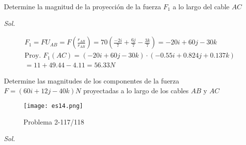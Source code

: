 \begin{problem}
Determine la magnitud de la proyección de la fuerza $F_1$ a lo largo del cable $AC$
\end{problem}
\textit{ Sol. }

\begin{align*}
	 & F_1=FU_{AB}=F\left(\frac{r_{AB}}{r_{AB}}\right)=70\left(\frac{-2i}{7}+\frac{6j}{7}-\frac{3k}{7}\right)=-20i+60j-30k \\
	 & \text{Proy. } F_1(AC)=(-20i+60j-30k)\cdot (-0.55i+0.824j+0.137k)                                                    \\
	 & =11+49.44-4.11=56.33N
\end{align*}

\begin{problem}
Determine las magnitudes de los componentes de la fuerza $F=(60i+12j-40k)N$ proyectadas a lo largo de los cables $AB$ y $AC$
\end{problem}

\begin{figure}[h!]
	\centering
	\texttt{[image: es14.png]}
	\caption{Problema 2-117/118}
	\label{es14}
\end{figure}

\textit{ Sol. }

